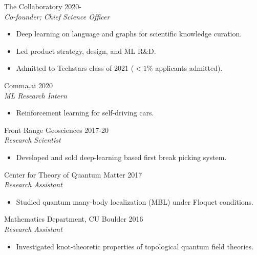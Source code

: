 \documentclass[margin]{res}
\begin{document}
\begin{resume}
                The Collaboratory \hfill 2020- \\
                 {\sl Co-founder; Chief Science Officer}
                 \begin{itemize}  \itemsep -2pt %
                 \item Deep learning on language and graphs for scientific knowledge curation.
                 \item Led product strategy, design, and ML R\&D.
                 \item Admitted to Techstars class of 2021 ($<1\%$ applicants admitted).
                 \end{itemize}

                 Comma.ai \hfill            2020 \\
		{\sl ML Research Intern}
                 \begin{itemize}  \itemsep -2pt %
                 \item Reinforcement learning for self-driving cars.
                 \end{itemize}

 
               Front Range Geosciences \hfill            2017-20 \\
                 {\sl Research Scientist}
                 \begin{itemize}  \itemsep -2pt %
                 \item Developed and sold deep-learning based first break picking system.
                 \end{itemize} 
                 Center for Theory of Quantum Matter \hfill            2017 \\
		{\sl Research Assistant}
                 \begin{itemize}  \itemsep -2pt %
                 \item Studied quantum many-body localization (MBL) under Floquet conditions.
                 \end{itemize}

                Mathematics Department, CU Boulder \hfill            2016 \\
		 {\sl Research Assistant}
                 \begin{itemize}  \itemsep -2pt %
                 \item Investigated knot-theoretic properties of topological quantum field theories.
                 \end{itemize}


\end{resume}
\end{document}

